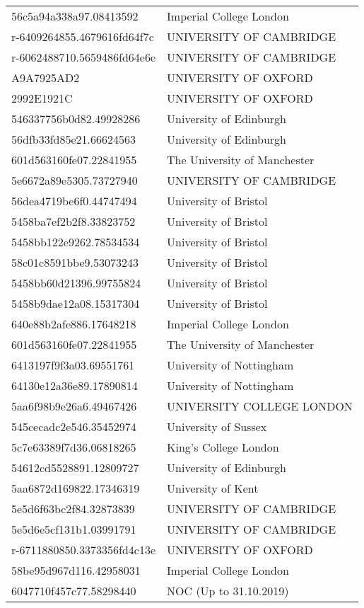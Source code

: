 \begin{tabular}{ll}
56c5a94a338a97.08413592 & Imperial College London \\
r-6409264855.4679616fd64f7c & UNIVERSITY OF CAMBRIDGE \\
r-6062488710.5659486fd64e6e & UNIVERSITY OF CAMBRIDGE \\
A9A7925AD2 & UNIVERSITY OF OXFORD \\
2992E1921C & UNIVERSITY OF OXFORD \\
546337756b0d82.49928286 & University of Edinburgh \\
56dfb33fd85e21.66624563 & University of Edinburgh \\
601d563160fe07.22841955 & The University of Manchester \\
5e6672a89e5305.73727940 & UNIVERSITY OF CAMBRIDGE \\
56dea4719be6f0.44747494 & University of Bristol \\
5458ba7ef2b2f8.33823752 & University of Bristol \\
5458bb122e9262.78534534 & University of Bristol \\
58c01c8591bbe9.53073243 & University of Bristol \\
5458bb60d21396.99755824 & University of Bristol \\
5458b9dae12a08.15317304 & University of Bristol \\
640e88b2afe886.17648218 & Imperial College London \\
601d563160fe07.22841955 & The University of Manchester \\
6413197f9f3a03.69551761 & University of Nottingham \\
64130e12a36e89.17890814 & University of Nottingham \\
5aa6f98b9e26a6.49467426 & UNIVERSITY COLLEGE LONDON \\
545cecadc2e546.35452974 & University of Sussex \\
5c7e63389f7d36.06818265 & King's College London \\
54612cd5528891.12809727 & University of Edinburgh \\
5aa6872d169822.17346319 & University of Kent \\
5e5d6f63bc2f84.32873839 & UNIVERSITY OF CAMBRIDGE \\
5e5d6e5cf131b1.03991791 & UNIVERSITY OF CAMBRIDGE \\
r-6711880850.3373356fd4c13e & UNIVERSITY OF OXFORD \\
58be95d967d116.42958031 & Imperial College London \\
6047710f457c77.58298440 & NOC (Up to 31.10.2019) \\

\end{tabular}
